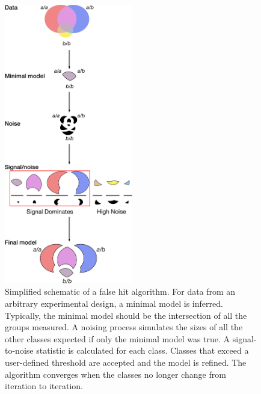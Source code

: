 \documentclass[10pt, twocolumn]{article}
\begin{document}
\begin{figure}
  \centering
  \includegraphics[width=0.5\textwidth]{../figs/false_hit_analysis.pdf}
  \caption{Simplified schematic of a false hit algorithm. For data from an
  arbitrary experimental design, a minimal model is inferred. Typically, the
  minimal model should be the intersection of all the groups measured. A noising
  process simulates the sizes of all the other classes expected if only the
  minimal model was true. A signal-to-noise statistic is calculated for each
  class. Classes that exceed a user-defined threshold are accepted and the model
  is refined. The algorithm converges when the classes no longer change from
  iteration to iteration.}
\label{fig:false_hit}
\end{figure}
\end{document}
